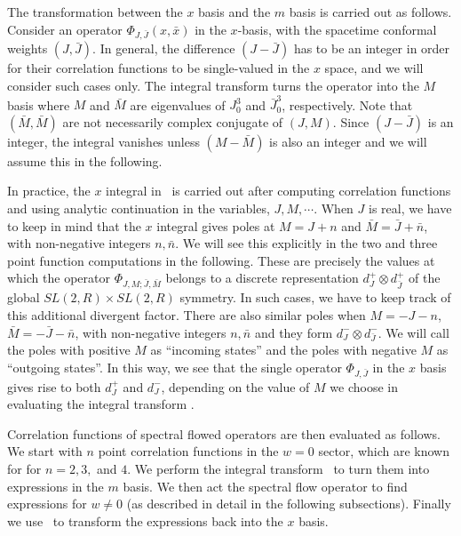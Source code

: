 The transformation between the $x$ basis and the $m$ basis is
carried out as follows.
Consider an operator $\Phi_{J, \bar{J}}(x,\bar{x})$
in the $x$-basis, with the spacetime conformal weights
$(J,\bar J)$.
In general, the difference $(J-\bar J)$ has to be
an integer in order for their correlation functions
to be single-valued in the $x$ space,
and we will consider such cases only. The integral transform
\eqn{}
turns the operator into the $M$ basis
 where
$M$ and $\bar M$ are eigenvalues of $J_0^3$ and $\bar J_0^3$,
respectively. Note that
$(\bar M, \bar M)$ are not necessarily
complex conjugate of $(J,M)$. Since
$(J-\bar J)$ is an integer, the integral vanishes unless
$(M-\bar M)$ is also an integer and we will assume this
in the following.

In practice,
the $x$ integral in \basis\ is carried out after computing
correlation functions and using analytic continuation in
the variables, $J, M, \cdots$.
When $J$ is real, we have to keep in mind
that the $x$ integral
gives poles at  $ M= J+n $ and $ \bar M = \bar J + \bar n$,
with non-negative integers $n , \bar n$. We will see this
explicitly in the two and three point function computations
in the following. These are precisely the values at which
the operator $\Phi_{J,M;\bar J, \bar M}$ belongs to
a discrete representation $d_J^+ \otimes d_{\bar J}^+$ of
the global $SL(2,R) \times SL(2,R)$ symmetry.
In such cases, we have
to keep track of this additional divergent factor.
There are also similar poles when $M=-J-n$, $\bar M = -\bar J - \bar n$,
with non-negative integers $n, \bar n$ and they
form $d_J^- \otimes d_{\bar J}^-$.
We will call the poles with positive $M$ as
``incoming states'' and the poles with negative $M$ as
``outgoing states''. In this way, we see that the single
operator $\Phi_{J,\bar J}$ in
the $x$ basis gives rise to both $d_J^+$ and $d_J^-$,
depending on the value of $M$ we choose in evaluating
the integral transform \basis.

Correlation functions of spectral flowed operators are
then evaluated as follows. We start with $n$ point
correlation functions in the $w=0$ sector, which are known for
for $n=2,3,$ and $4$.
We perform the integral transform \basis\ to turn them
into expressions in the $m$ basis. We then act the spectral
flow operator to find expressions for $w\neq 0$ (as described
in detail in the following subsections). Finally we use
\basis\ to transform the expressions back into the $x$ basis.

